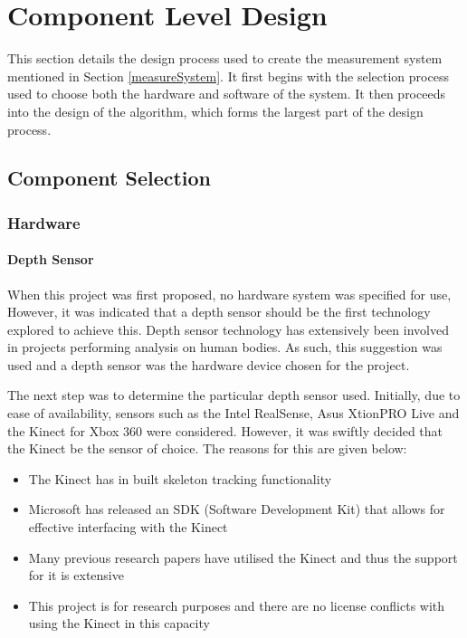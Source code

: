 \section{Component Level Design}
This section details the design process used to create the measurement system mentioned in Section \ref{measureSystem}. It first begins with the selection process used to choose both the hardware and software of the system. It then proceeds into the design of the algorithm, which forms the largest part of the design process.

\subsection{Component Selection}

\subsubsection{Hardware}

\paragraph{Depth Sensor}
When this project was first proposed, no hardware system was specified for use, However, it was indicated that a depth sensor should be the first technology explored to achieve this. Depth sensor technology has extensively been involved in projects performing analysis on human bodies. As such, this suggestion was used and a depth sensor was the hardware device chosen for the project. 

The next step was to determine the particular depth sensor used. Initially, due to ease of availability, sensors such as the Intel RealSense, Asus XtionPRO Live and the Kinect for Xbox 360 were considered. However, it was swiftly decided that the Kinect be the sensor of choice. The reasons for this are given below:

\begin{itemize}
	\item The Kinect has in built skeleton tracking functionality
	\item Microsoft has released an SDK (Software Development Kit) that allows for effective interfacing with the Kinect 
	\item Many previous research papers have utilised the Kinect and thus the support for it is extensive
	\item This project is for research purposes and there are no license conflicts with using the Kinect in this capacity
\end{itemize}

